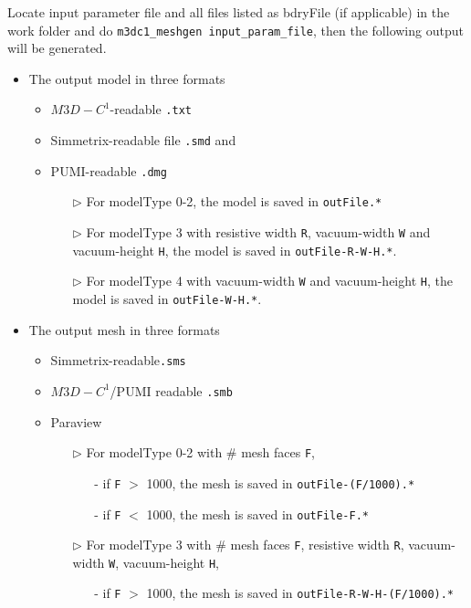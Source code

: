 Locate input parameter file and all files listed as bdryFile (if applicable) in the work folder and do \texttt{m3dc1\_meshgen input\_param\_file}, then the following output will be generated.

\begin{itemize}
\item The output model in three formats
  \begin{itemize}
  \item	$M3D-C^1$-readable \texttt{.txt}
  \item	Simmetrix-readable file \texttt{.smd} and 
  \item	PUMI-readable \texttt{.dmg}
    \begin{itemize}
    \item[$\triangleright$] For modelType 0-2, the model is saved in \texttt{outFile.*}
    \item[$\triangleright$] For modelType 3 with resistive width \texttt{R}, vacuum-width \texttt{W} and vacuum-height \texttt{H}, the model is saved in \texttt{outFile-R-W-H.*}.
    \item[$\triangleright$] For modelType 4 with vacuum-width \texttt{W} and vacuum-height \texttt{H}, the model is saved in \texttt{outFile-W-H.*}.
    \end{itemize}
  \end{itemize}
\item The output mesh in three formats
  \begin{itemize}
  \item Simmetrix-readable\texttt{.sms}
  \item $M3D-C^1$/PUMI readable \texttt{.smb}
  \item Paraview 
    \begin{itemize}
    \item[$\triangleright$] For modelType 0-2 with \# mesh faces \texttt{F}, 
      \begin{itemize}
      \item[-] if \texttt{F} $>$ 1000, the mesh is saved in \texttt{outFile-(F/1000).*}
      \item[-] if \texttt{F} $<$ 1000, the mesh is saved in \texttt{outFile-F.*}
      \end{itemize}
    \item[$\triangleright$] For modelType 3 with \# mesh faces \texttt{F}, resistive width \texttt{R}, vacuum-width \texttt{W}, vacuum-height \texttt{H},
      \begin{itemize}
      \item[-] if \texttt{F} $>$ 1000, the mesh is saved in \texttt{outFile-R-W-H-(F/1000).*}

\end{itemize}
\end{itemize}
\end{itemize}
\end{itemize}
